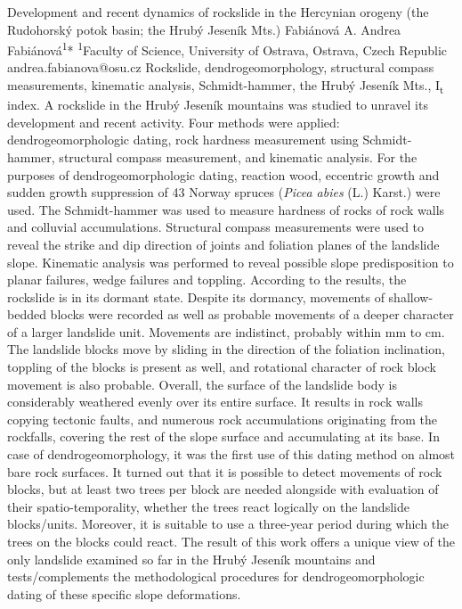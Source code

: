 \abstract
{Development and recent dynamics of rockslide in the Hercynian orogeny (the Rudohorský potok basin; the Hrubý Jeseník Mts.)} 
{Fabiánová A.} 
{Andrea Fabiánová\textsuperscript{1}*} 
{\TLtag} 
{
\textsuperscript{1}Faculty of Science, University of Ostrava, Ostrava, Czech Republic
}
{andrea.fabianova@osu.cz}  %
{Rockslide, dendrogeomorphology, structural compass measurements, kinematic analysis, Schmidt-hammer, the Hrubý Jeseník Mts., I\textsubscript{t} index.}
{A rockslide in the Hrubý Jeseník mountains was studied to unravel its development and recent activity. Four methods were applied: dendrogeomorphologic dating, rock hardness measurement using Schmidt-hammer, structural compass measurement, and kinematic analysis. For the purposes of dendrogeomorphologic dating, reaction wood, eccentric growth and sudden growth suppression of 43 Norway spruces (\textit{Picea abies} (L.) Karst.) were used. The Schmidt-hammer was used to measure hardness of rocks of rock walls and colluvial accumulations. Structural compass measurements were used to reveal the strike and dip direction of joints and foliation planes of the landslide slope. Kinematic analysis was performed to reveal possible slope predisposition to planar failures, wedge failures and toppling. According to the results, the rockslide is in its dormant state. Despite its dormancy, movements of shallow-bedded blocks were recorded as well as probable movements of a deeper character of a larger landslide unit. Movements are indistinct, probably within mm to cm. The landslide blocks move by sliding in the direction of the foliation inclination, toppling of the blocks is present as well, and rotational character of rock block movement is also probable. Overall, the surface of the landslide body is considerably weathered evenly over its entire surface. It results in rock walls copying tectonic faults, and numerous rock accumulations originating from the rockfalls, covering the rest of the slope surface and accumulating at its base. In case of dendrogeomorphology, it was the first use of this dating method on almost bare rock surfaces. It turned out that it is possible to detect movements of rock blocks, but at least two trees per block are needed alongside with evaluation of their spatio-temporality, whether the trees react logically on the landslide blocks/units. Moreover, it is suitable to use a three-year period during which the trees on the blocks could react. The result of this work offers a unique view of the only landslide examined so far in the Hrubý Jeseník mountains and tests/complements the methodological procedures for dendrogeomorphologic dating of these specific slope deformations.
}
{
}

